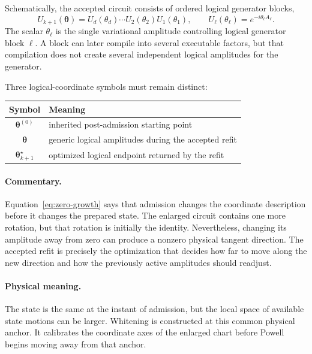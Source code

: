 \documentclass[11pt]{article}
\newcommand{\commentary}{\paragraph{Commentary.}}
\newcommand{\physical}{\paragraph{Physical meaning.}}
\begin{document}
Schematically, the accepted circuit consists of ordered logical generator
blocks,
\begin{equation}
U_{k+1}(\boldsymbol\theta)
=
U_d(\theta_d)\cdots U_2(\theta_2)U_1(\theta_1),
\qquad
U_\ell(\theta_\ell)=e^{-i\theta_\ell A_\ell}.
\label{eq:logical-block-circuit}
\end{equation}
The scalar \(\theta_\ell\) is the single variational amplitude controlling
logical generator block \(\ell\).  A block can later compile into several
executable factors, but that compilation does not create several independent
logical amplitudes for the generator.

Three logical-coordinate symbols must remain distinct:
\begin{center}
\renewcommand{\arraystretch}{1.18}
\begin{tabular}{@{}cl@{}}
\toprule
Symbol & Meaning \\
\midrule
\(\boldsymbol\theta^{(0)}\) &
inherited post-admission starting point \\
\(\boldsymbol\theta\) &
generic logical amplitudes during the accepted refit \\
\(\boldsymbol\theta_{k+1}^\star\) &
optimized logical endpoint returned by the refit \\
\bottomrule
\end{tabular}
\end{center}

\commentary Equation~\eqref{eq:zero-growth} says that admission changes the
coordinate description before it changes the prepared state.  The enlarged
circuit contains one more rotation, but that rotation is initially the
identity.  Nevertheless, changing its amplitude away from zero can produce a
nonzero physical tangent direction.  The accepted refit is precisely the
optimization that decides how far to move along the new direction and how
the previously active amplitudes should readjust.

\physical The state is the same at the instant of admission, but the local
space of available state motions can be larger.  Whitening is constructed at
this common physical anchor.  It calibrates the coordinate axes of the
enlarged chart before Powell begins moving away from that anchor.

\noindent{}
\end{document}
